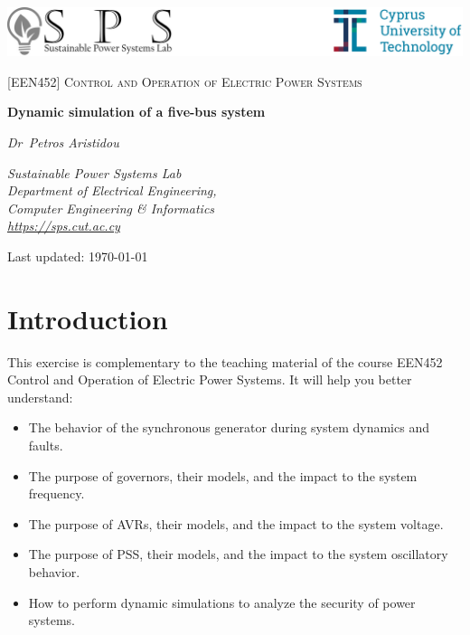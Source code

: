 \documentclass[a4paper,11pt,oneside,onecolumn]{article}
\begin{document}
\begin{titlepage}
	
	\includegraphics[width=\textwidth]{SPS_logo}\par\vfill
	
	\centering 
	{\scshape\Large [EEN452] Control and Operation of Electric Power Systems\par}
	{\huge\bfseries Dynamic simulation of a five-bus system\par}
	\vspace{2cm}
	{\Large\itshape Dr~Petros Aristidou\par}
	\vspace{0.5cm}
	\textit{Sustainable Power Systems Lab\\Department of Electrical Engineering,\\Computer Engineering \& Informatics\\\url{https://sps.cut.ac.cy}}
	
	\vfill
	
	{\large Last updated: \today\par}
\end{titlepage}
\thispagestyle{empty}

\tableofcontents{}

\clearpage

\section{Introduction}

This exercise is complementary to the teaching material of the course EEN452 Control and Operation of Electric Power Systems. It will help you better understand:
\begin{itemize}
	\item The behavior of the synchronous generator during system dynamics and faults.
	\item The purpose of governors, their models, and the impact to the system frequency.
	\item The purpose of AVRs, their models, and the impact to the system voltage.
	\item The purpose of PSS, their models, and the impact to the system oscillatory behavior.
	\item How to perform dynamic simulations to analyze the security of power systems.
\end{itemize}
\end{document}
